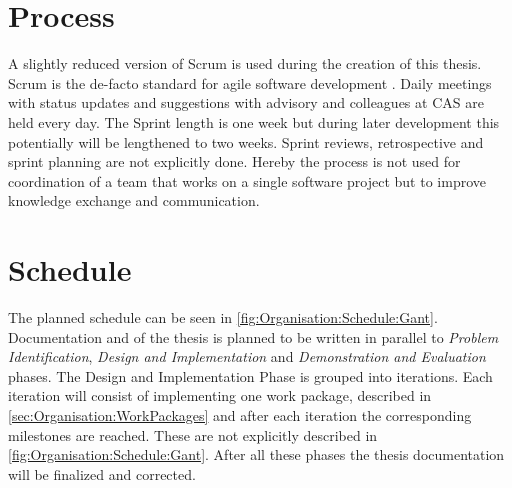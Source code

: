 \section{Process}
\label{sec:Organisation:Process}

A slightly reduced version of Scrum is used during the creation of this thesis. Scrum is the de-facto standard for agile software development \cite{glogerScrumPradigmenwechselIm2010}. Daily meetings with status updates and suggestions with advisory and colleagues at CAS are held every day. The Sprint length is one week but during later development this potentially will be lengthened to two weeks. Sprint reviews, retrospective and sprint planning are not explicitly done. Hereby the process is not used for coordination of a team that works on a single software project but to improve knowledge exchange and communication.

\section{Schedule}
\label{sec:Organisation:Schedule}

The planned schedule can be seen in \autoref{fig:Organisation:Schedule:Gant}. Documentation and of the thesis is planned to be written in parallel to  \emph{Problem Identification}, \emph{Design and Implementation} and \emph{Demonstration and Evaluation} phases. The Design and Implementation Phase is grouped into iterations. Each iteration will consist of implementing one work package, described in \autoref{sec:Organisation:WorkPackages} and after each iteration the corresponding milestones are reached. These are not explicitly described in \autoref{fig:Organisation:Schedule:Gant}. After all these phases the thesis documentation will be finalized and corrected. 


